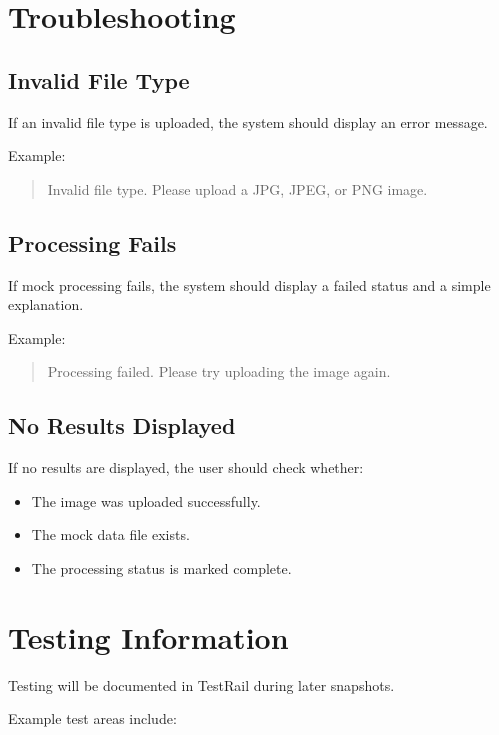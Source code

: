 \documentclass[12pt]{article}
\begin{document}
\section{Troubleshooting}

\subsection{Invalid File Type}

If an invalid file type is uploaded, the system should display an error message.

Example:

\begin{quote}
Invalid file type. Please upload a JPG, JPEG, or PNG image.
\end{quote}

\subsection{Processing Fails}

If mock processing fails, the system should display a failed status and a simple explanation.

Example:

\begin{quote}
Processing failed. Please try uploading the image again.
\end{quote}

\subsection{No Results Displayed}

If no results are displayed, the user should check whether:

\begin{itemize}
    \item The image was uploaded successfully.
    \item The mock data file exists.
    \item The processing status is marked complete.
\end{itemize}

\section{Testing Information}

Testing will be documented in TestRail during later snapshots.

Example test areas include:
\end{document}
